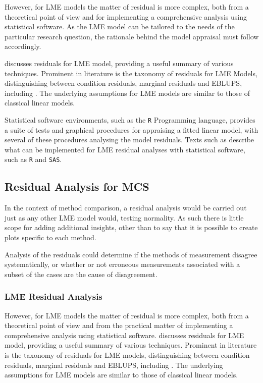 \documentclass[]{report}
\begin{document}
However, for LME models the matter of residual is more complex, both from a theoretical point of view and for implementing a comprehensive analysis using statistical software. As the LME model can be tailored to the needs of the particular research question, the rationale behind the model appraisal must follow accordingly.
	
\citet{schabenberger} discusses residuals for LME model, providing a useful summary of various techniques. Prominent in literature is the taxonomy of residuals for LME Models, distinguishing between condition residuals, marginal residuals and EBLUPS, including \citet{ HildenMinton, schabenberger, west, NobreSinger2011}. The underlying assumptions for LME models are similar to those of classical linear models. 
	
Statistical software environments, such as the \texttt{R} Programming language, provides a suite of tests and graphical procedures for appraising a fitted linear model, with several of these procedures analysing the model residuals. Texts such as \citet{PB,west,Galecki} describe what can be implemented for LME residual analyses with statistical software, such as \texttt{R} and \texttt{SAS}.
	
\subsection{Residual Analysis for MCS}	
In the context of method comparison, a residual analysis would be carried out just as any other LME model would, testing normality. As such there is little scope for adding additional insights, other than to say that it is possible to create plots specific to each method. 
	
Analysis of the residuals could determine if the methods of measurement disagree systematically, or whether or not erroneous measurements associated with a subset of the cases are the cause of disagreement. 


\subsubsection{LME Residual Analysis}
However, for LME models the matter of residual is more complex, both from a theoretical point of view and from the practical matter of implementing a comprehensive analysis using statistical software. \citet{schabenberger} discusses residuals for LME model, providing a useful summary of various techniques. Prominent in literature is the taxonomy of residuals for LME models, distinguishing between condition residuals, marginal residuals and EBLUPS, including \citet{hildenminton, schabenberger, west, nobresinger2007}. The underlying assumptions for LME models are similar to those of classical linear models. 
	
\end{document}
